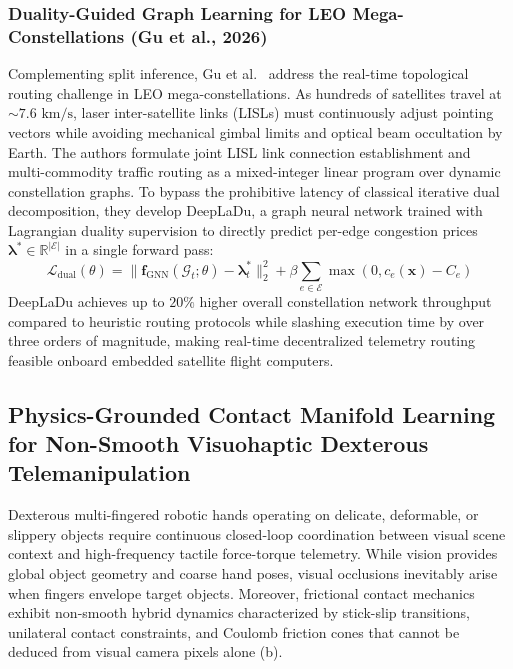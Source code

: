 \subsubsection{Duality-Guided Graph Learning for LEO Mega-Constellations (Gu et al., 2026)}
Complementing split inference, Gu et al.~\cite{Gu2026LEOConstellation} address the real-time topological routing challenge in LEO mega-constellations. As hundreds of satellites travel at $\sim 7.6\text{ km/s}$, laser inter-satellite links (LISLs) must continuously adjust pointing vectors while avoiding mechanical gimbal limits and optical beam occultation by Earth. The authors formulate joint LISL link connection establishment and multi-commodity traffic routing as a mixed-integer linear program over dynamic constellation graphs. To bypass the prohibitive latency of classical iterative dual decomposition, they develop DeepLaDu, a graph neural network trained with Lagrangian duality supervision to directly predict per-edge congestion prices $\boldsymbol{\lambda}^* \in \mathbb{R}^{|\mathcal{E}|}$ in a single forward pass:
\begin{equation}
    \mathcal{L}_{\text{dual}}(\theta) = \|\mathbf{f}_{\text{GNN}}(\mathcal{G}_t; \theta) - \boldsymbol{\lambda}^*_t\|_2^2 + \beta \sum_{e \in \mathcal{E}} \max(0, c_e(\mathbf{x}) - C_e)
\end{equation}
DeepLaDu achieves up to $20\%$ higher overall constellation network throughput compared to heuristic routing protocols while slashing execution time by over three orders of magnitude, making real-time decentralized telemetry routing feasible onboard embedded satellite flight computers.

\subsection{Physics-Grounded Contact Manifold Learning for Non-Smooth Visuohaptic Dexterous Telemanipulation}
\label{sec:visuohaptic_contact_manifold}

Dexterous multi-fingered robotic hands operating on delicate, deformable, or slippery objects require continuous closed-loop coordination between visual scene context and high-frequency tactile force-torque telemetry. While vision provides global object geometry and coarse hand poses, visual occlusions inevitably arise when fingers envelope target objects. Moreover, frictional contact mechanics exhibit non-smooth hybrid dynamics characterized by stick-slip transitions, unilateral contact constraints, and Coulomb friction cones that cannot be deduced from visual camera pixels alone (b).

